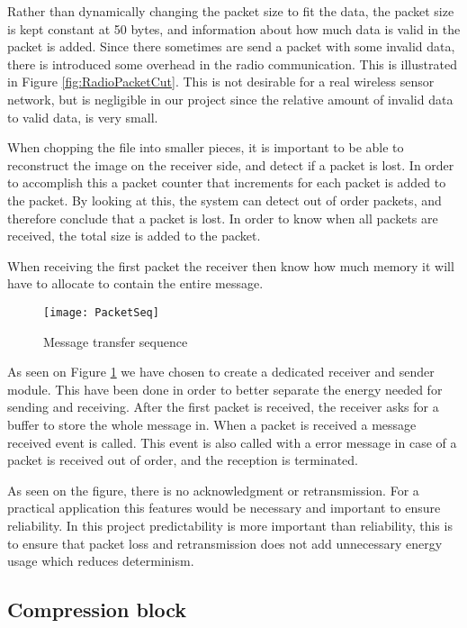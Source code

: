 Rather than dynamically changing the packet size to fit the data, the packet size is kept constant at  50 bytes, and information about how much data is valid in the packet is added. 
Since there sometimes are send a packet with some invalid data, there is introduced some overhead in the radio communication. 
This is illustrated in Figure \ref{fig:RadioPacketCut}. 
This is not desirable for a real wireless sensor network, but is negligible in our project since the relative amount of invalid data to valid data, is very small.

When chopping the file into smaller pieces, it is important to be able to reconstruct the image on the receiver side, and detect if a packet is lost. 
In order to accomplish this a packet counter that increments for each packet is added to the packet. 
By looking at this, the system can detect out of order packets, and therefore conclude that a packet is lost. 
In order to know when all packets are received, the total size is added to the packet.

When receiving the first packet the receiver then know how much memory it will have to allocate to contain the entire message. 


\begin{figure}[H]
	\centering
	\texttt{[image: PacketSeq]}
	\caption{Message transfer sequence }
	\label{fig:PacketSeq}
\end{figure}

As seen on Figure \ref{fig:PacketSeq} we have chosen to create a dedicated receiver and sender module. 
This have been done in order to better separate the energy needed for sending and receiving. 
After the first packet is received, the receiver asks for a buffer to store the whole message in. 
When a packet is received a message received event is called. 
This event is also called with a error message in case of a packet is received out of order, and the reception is terminated. 

As seen on the figure, there is no acknowledgment or retransmission. 
For a practical application this features would be necessary and important to ensure reliability.
In this project predictability is more important than reliability, this is to ensure that packet loss and retransmission does not add unnecessary energy usage which reduces determinism.


\subsection{Compression block}
\label{sec:Compression-block}

